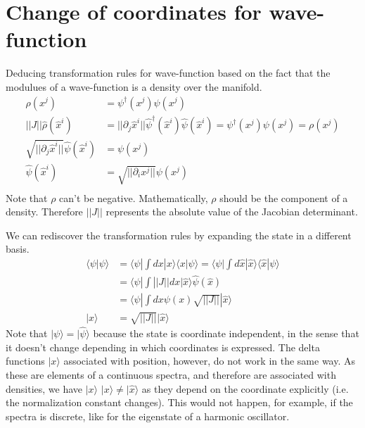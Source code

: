 \documentclass[11pt]{article}
\def\>{\rangle}
\def\<{\langle}
\begin{document}
\section{Change of coordinates for wave-function}

Deducing transformation rules for wave-function based on the fact that the modulues of a wave-function is a density over the manifold.
\begin{equation}
	\begin{aligned}
		\rho(x^j) &= \psi^\dagger(x^j) \psi(x^j)\\
		||J|| \hat{\rho}(\hat{x}^i) &= || \partial_j \hat{x}^i || \hat{\psi}^\dagger(\hat{x}^i) \hat{\psi}(\hat{x}^i) = \psi^\dagger(x^j) \psi(x^j) = \rho(x^j) \\
		\sqrt{|| \partial_j \hat{x}^i ||} \hat{\psi}(\hat{x}^i) &= \psi(x^j) \\
		\hat{\psi}(\hat{x}^i) &= \sqrt{|| \partial_i x^j ||} \psi(x^j) \\
	\end{aligned}
\end{equation}
Note that $\rho$ can't be negative. Mathematically,  $\rho$ should be the component of a density. Therefore $||J||$ represents the absolute value of the Jacobian determinant.

We can rediscover the transformation rules by expanding the state in a different basis.
\begin{equation}
	\begin{aligned}
		\< \psi | \psi \> &= \< \psi | \int dx | x \> \< x | \psi\>  = \< \psi | \int d\hat{x} | \hat{x} \> \< \hat{x} | \psi\> \\
		&= \< \psi | \int ||J|| dx | \hat{x} \> \hat{\psi}(\hat{x}) \\
		&= \< \psi | \int dx \psi(x) \sqrt{||J||} | \hat{x} \>  \\
		| x \> &= \sqrt{||J||} | \hat{x} \>
	\end{aligned}
\end{equation}
Note that $|\psi\> = |\hat{\psi}\>$ because the state is coordinate independent, in the sense that it doesn't change depending in which coordinates is expressed. The delta functions $| x \>$ associated with position, however, do not work in the same way. As these are elements of a continuous spectra, and therefore are associated with densities, we have $| x \>$ $| x \> \neq | \hat{x} \>$ as they depend on the coordinate explicitly (i.e. the normalization constant changes). This would not happen, for example, if the spectra is discrete, like for the eigenstate of a harmonic oscillator.
\end{document}
